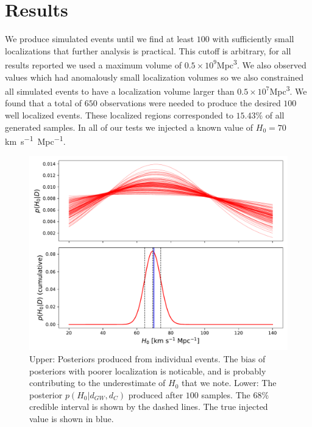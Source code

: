 \section{Results} \label{sec:conclusions}
We produce simulated events until we find at least $100$ with sufficiently small localizations that further analysis is practical.
This cutoff is arbitrary, for all results reported we used a maximum volume of $0.5\times 10^{9}$\si{Mpc^3}.
We also observed values which had anomalously small localization volumes so we also constrained all simulated events to have a localization volume larger than $0.5\times 10^{7}$\si{Mpc^3}.
We found that a total of $650$ observations were needed to produce the desired $100$ well localized events.
These localized regions corresponded to $15.43\%$ of all generated samples.
In all of our tests we injected a known value of $H_0=70$\si{km.s^{-1}.Mpc^{-1}}.


\begin{figure}[t]
    \centering
    \includegraphics[width=\columnwidth]{figures/posterior.pdf}
    \caption{Upper: Posteriors produced from individual events. The bias of posteriors with poorer localization is noticable, and is probably contributing to the underestimate of $H_0$ that we note. Lower: The posterior $p(H_0 | d_{GW}, d_C)$ produced after $100$ samples. The $68\%$ credible interval is shown by the dashed lines. The true injected value is shown in blue.}
    \label{fig:posterior}
\end{figure}

